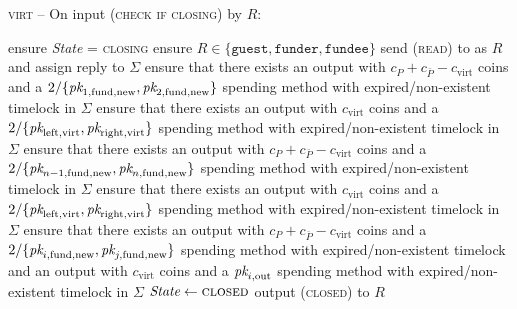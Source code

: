 \begin{center}
  \begin{processbox}{\textsc{virt} -- On input (\textsc{check if closing}) by
  $R$:}
    \begin{algorithmic}[1]
      \State ensure \textit{State} = \textsc{closing}
      \State ensure $R \in \{\texttt{guest}, \texttt{funder}, \texttt{fundee}\}$
      \State send (\textsc{read}) to \ledger as $R$ and assign reply to $\Sigma$
       
        \State ensure that there exists an output with $c_P + c_{\bar{P}} -
        c_{\mathrm{virt}}$ coins and a $2/\{\textit{pk}_{1, \mathrm{fund}, \mathrm{new}},
        \textit{pk}_{2, \mathrm{fund}, \mathrm{new}}\}$ spending method with
        expired/non-existent timelock in $\Sigma$ 
        \label{code:virtual-layer:check-chain-close:funder:output-funder}
        \State ensure that there exists an output with $c_{\mathrm{virt}}$ coins
        and a $2/\{\textit{pk}_{\mathrm{left}, \mathrm{virt}}, \textit{pk}_{\mathrm{right},
        \mathrm{virt}}\}$ spending method with expired/non-existent timelock in
        $\Sigma$ 
        \label{code:virtual-layer:check-chain-close:funder:output-virt}
       
        \State ensure that there exists an output with $c_P + c_{\bar{P}} -
        c_{\mathrm{virt}}$ coins and a $2/\{\textit{pk}_{n-1, \mathrm{fund},
        \mathrm{new}}, \textit{pk}_{n, \mathrm{fund}, \mathrm{new}}\}$ spending method
        with expired/non-existent timelock in $\Sigma$ 
        \State ensure that there exists an output with $c_{\mathrm{virt}}$ coins
        and a $2/\{\textit{pk}_{\mathrm{left}, \mathrm{virt}}, \textit{pk}_{\mathrm{right},
        \mathrm{virt}}\}$ spending method with expired/non-existent timelock in
        $\Sigma$ 
      \Else \: 
         
        \State ensure that there exists an output with $c_P + c_{\bar{P}} -
        c_{\mathrm{virt}}$ coins and a $2/\{\textit{pk}_{i, \mathrm{fund}, \mathrm{new}},
        \textit{pk}_{j, \mathrm{fund}, \mathrm{new}}\}$ spending method with
        expired/non-existent timelock and an output with $c_{\mathrm{virt}}$
        coins and a $\textit{pk}_{i, \mathrm{out}}$ spending method with
        expired/non-existent timelock in $\Sigma$
      \EndIf
      \State $\textit{State} \gets \textsc{closed}$
      \State output (\textsc{closed}) to $R$
    \end{algorithmic}
  \end{processbox}
  \label{code:virtual-layer:check-chain-close}
\end{center} \ \\

